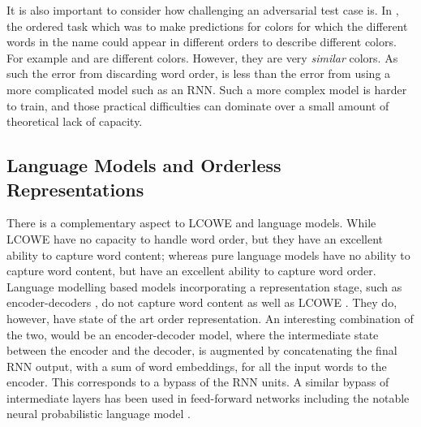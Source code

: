 \documentclass{book}
\begin{document}
It is also important to consider how challenging an adversarial test case is.
In , the ordered task which was to make predictions for colors for which the different words in the name could appear in different orders to describe different colors.
For example  and  are different colors.
However, they are very \emph{similar} colors.
As such the error from discarding word order, is less than the error from using a more complicated model such as an RNN.
Such a more complex model is harder to train, and those practical difficulties can dominate over a small amount of theoretical lack of capacity.



\subsection{Language Models and Orderless Representations}

There is a complementary aspect to LCOWE and language models.
While LCOWE have no capacity to handle word order, but they have an excellent ability to capture word content;
whereas pure language models have no ability to capture word content, but have an excellent ability to capture word order.
Language modelling based models incorporating a representation stage, such as encoder-decoders \citep{cho-EtAl:2014:EMNLP2014}, do not capture word content as well as LCOWE \citep{ac2018probingsentencevectors}.
They do, however, have state of the art order representation.
An interesting combination of the two,
would be an encoder-decoder model,
where the intermediate state between the encoder and the decoder,
is augmented by concatenating the final RNN output, with a sum of word embeddings, for all the input words to the encoder.
This corresponds to a bypass of the RNN units.
A similar bypass of intermediate layers has been used in feed-forward networks including the notable neural probabilistic language model \citep{NPLM}.
\end{document}
